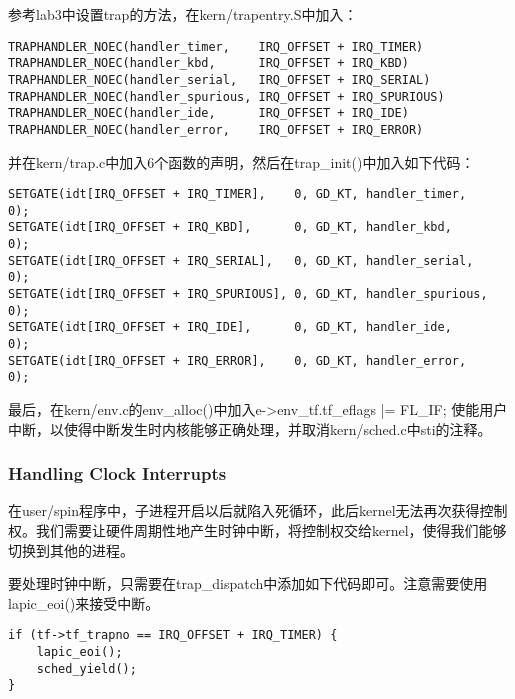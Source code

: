 \begin{exerciseSolution}{13}
    \par 参考lab3中设置trap的方法，在kern/trapentry.S中加入：
    \begin{lstlisting}
TRAPHANDLER_NOEC(handler_timer,    IRQ_OFFSET + IRQ_TIMER)
TRAPHANDLER_NOEC(handler_kbd,      IRQ_OFFSET + IRQ_KBD)
TRAPHANDLER_NOEC(handler_serial,   IRQ_OFFSET + IRQ_SERIAL)
TRAPHANDLER_NOEC(handler_spurious, IRQ_OFFSET + IRQ_SPURIOUS)
TRAPHANDLER_NOEC(handler_ide,      IRQ_OFFSET + IRQ_IDE)
TRAPHANDLER_NOEC(handler_error,    IRQ_OFFSET + IRQ_ERROR)
    \end{lstlisting}
    \par 并在kern/trap.c中加入6个函数的声明，然后在trap\_init()中加入如下代码：
    \begin{lstlisting}
SETGATE(idt[IRQ_OFFSET + IRQ_TIMER],    0, GD_KT, handler_timer,    0);
SETGATE(idt[IRQ_OFFSET + IRQ_KBD],      0, GD_KT, handler_kbd,      0);
SETGATE(idt[IRQ_OFFSET + IRQ_SERIAL],   0, GD_KT, handler_serial,   0);
SETGATE(idt[IRQ_OFFSET + IRQ_SPURIOUS], 0, GD_KT, handler_spurious, 0);
SETGATE(idt[IRQ_OFFSET + IRQ_IDE],      0, GD_KT, handler_ide,      0);
SETGATE(idt[IRQ_OFFSET + IRQ_ERROR],    0, GD_KT, handler_error,    0);
    \end{lstlisting}

    \par 最后，在kern/env.c的env\_alloc()中加入e->env\_tf.tf\_eflags |= FL\_IF; 使能用户中断，以使得中断发生时内核能够正确处理，并取消kern/sched.c中sti的注释。
\end{exerciseSolution}

\subsubsection{Handling Clock Interrupts}
\par 在user/spin程序中，子进程开启以后就陷入死循环，此后kernel无法再次获得控制权。我们需要让硬件周期性地产生时钟中断，将控制权交给kernel，使得我们能够切换到其他的进程。

\begin{exerciseSolution}{14}
    \par 要处理时钟中断，只需要在trap\_dispatch中添加如下代码即可。注意需要使用lapic\_eoi()来接受中断。
    \begin{lstlisting}
if (tf->tf_trapno == IRQ_OFFSET + IRQ_TIMER) {
    lapic_eoi();
    sched_yield();
}
    \end{lstlisting}
\end{exerciseSolution}

